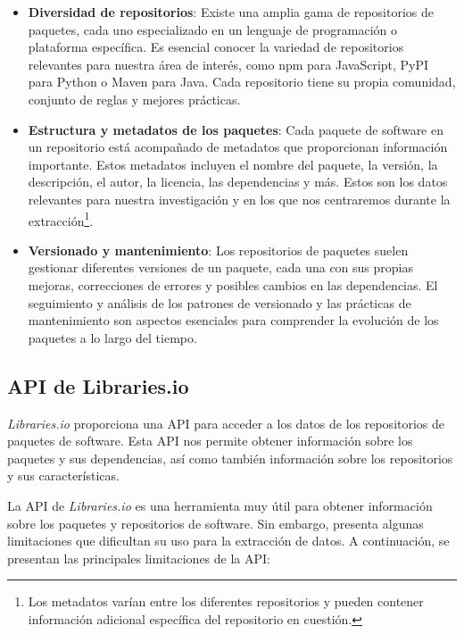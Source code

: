 \begin{itemize}
    \item \textbf{Diversidad de repositorios}: Existe una amplia gama de repositorios de paquetes,
          cada uno especializado en un lenguaje de programación o plataforma específica. Es esencial
          conocer la variedad de repositorios relevantes para nuestra área de interés, como npm para JavaScript,
          PyPI para Python o Maven para Java. Cada repositorio tiene su propia comunidad, conjunto de reglas
          y mejores prácticas.
    \item \textbf{Estructura y metadatos de los paquetes}: Cada paquete de software en un repositorio
          está acompañado de metadatos que proporcionan información importante. Estos metadatos incluyen el
          nombre del paquete, la versión, la descripción, el autor, la licencia, las dependencias y más.
          Estos son los datos relevantes para nuestra investigación y en los que nos centraremos durante
          la extracción\footnote{Los metadatos varían entre los diferentes repositorios y pueden contener
              información adicional específica del repositorio en cuestión.}.
    \item \textbf{Versionado y mantenimiento}: Los repositorios de paquetes suelen gestionar diferentes
          versiones de un paquete, cada una con sus propias mejoras, correcciones de errores y posibles cambios
          en las dependencias. El seguimiento y análisis de los patrones de versionado y las prácticas de
          mantenimiento son aspectos esenciales para comprender la evolución de los paquetes a lo largo del
          tiempo.
\end{itemize}

\subsection{API de Libraries.io}

\textit{Libraries.io} proporciona una API para acceder a los datos de los repositorios de paquetes
de software. Esta API nos permite obtener información sobre los paquetes y sus dependencias,
así como también información sobre los repositorios y sus características.

La API de \textit{Libraries.io} es una herramienta muy útil para obtener información sobre los
paquetes y repositorios de software. Sin embargo, presenta algunas limitaciones que dificultan
su uso para la extracción de datos. A continuación, se presentan las principales limitaciones
de la API:

